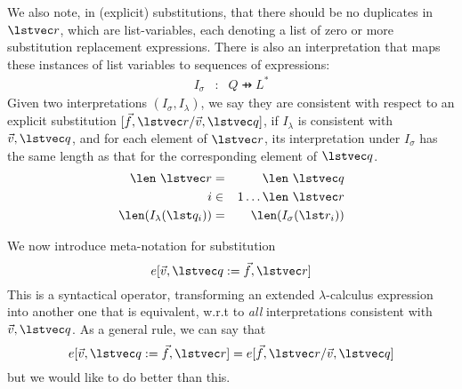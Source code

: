 We also note, in (explicit) substitutions,
that there should be no duplicates in $\lstvec r$,
which are list-variables, each denoting a list of zero or more
substitution replacement expressions.
There is also an interpretation that maps these instances of list variables to 
sequences of expressions:
\begin{eqnarray*}
   I_{\sigma} &:& Q \pfun L^*
\end{eqnarray*}
Given two interpretations $(I_{\sigma},I_{\lambda})$,
we say they are consistent with respect to  an explicit substitution
$[\vec f,\lstvec r/\vec v,\lstvec q]$, if $I_{\lambda}$ is consistent with
$\vec v,\lstvec q$, and for each element of $\lstvec r$,
its interpretation under $I_{\sigma}$ has the same length as that for the 
corresponding element of $\lstvec q$.
\begin{eqnarray*}
  \len~\lstvec r &=& \len~\lstvec q
\\ i &\in& 1 \ldots \len~ \lstvec r
\\ \len(I_{\lambda}(\lst q_i))
   &=&
   \len(I_{\sigma}(\lst r_i))
\end{eqnarray*}

We now introduce meta-notation for substitution
$$
  e[\vec v,\lstvec q:=\vec f,\lstvec r]
$$
This is a syntactical operator, transforming an extended $\lambda$-calculus
expression into another one that is equivalent, w.r.t to \emph{all} interpretations
consistent with $\vec v,\lstvec q$.
As a general rule, we can say that
$$
 e[\vec v,\lstvec q:=\vec f,\lstvec r]
 =
 e[\vec f,\lstvec r/\vec v,\lstvec q]
$$
but we would like to do better than this.

